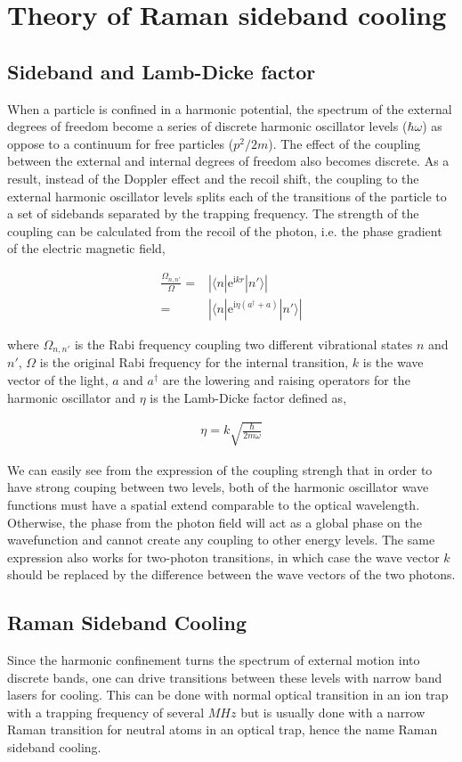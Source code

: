 \documentclass[aps,twocolumn,secnumarabic,balancelastpage,amsmath,amssymb,nofootinbib]{revtex4}
\newcommand{\ue}{\mathrm{e}}
\newcommand{\ui}{\mathrm{i}}
\newcommand{\eqar}[1]
{
  \begin{align*}
    #1
  \end{align*}
}
\newcommand{\paren}[1]{{\left({#1}\right)}}
\newcommand{\abs}[1]{{\left|{#1}\right|}}
\begin{document}
\section{Theory of Raman sideband cooling}
\subsection{Sideband and Lamb-Dicke factor}
When a particle is confined in a harmonic potential, the spectrum of the external degrees of freedom become a series of discrete harmonic oscillator levels ($\hbar\omega$) as oppose to a continuum for free particles ($p^2/2m$). The effect of the coupling between the external and internal degrees of freedom also becomes discrete. As a result, instead of the Doppler effect and the recoil shift, the coupling to the external harmonic oscillator levels splits each of the transitions of the particle to a set of sidebands separated by the trapping frequency. The strength of the coupling can be calculated from the recoil of the photon, i.e. the phase gradient of the electric magnetic field,
\eqar{
  \frac{\Omega_{n,n'}}{\Omega}=&\abs{\langle n|\ue^{\ui kr}|n'\rangle}\\
  =&\abs{\langle n|\ue^{\ui \eta\paren{a^\dagger+a}}|n'\rangle}
}
where $\Omega_{n,n'}$ is the Rabi frequency coupling two different vibrational states $n$ and $n'$, $\Omega$ is the original Rabi frequency for the internal transition, $k$ is the wave vector of the light, $a$ and $a^\dagger$ are the lowering and raising operators for the harmonic oscillator and $\eta$ is the Lamb-Dicke factor defined as,
\eqar{
  \eta=k\sqrt{\frac{\hbar}{2m\omega}}
}
We can easily see from the expression of the coupling strengh that in order to have strong couping between two levels, both of the harmonic oscillator wave functions must have a spatial extend comparable to the optical wavelength. Otherwise, the phase from the photon field will act as a global phase on the wavefunction and cannot create any coupling to other energy levels. The same expression also works for two-photon transitions, in which case the wave vector $k$ should be replaced by the difference between the wave vectors of the two photons.

\subsection{Raman Sideband Cooling}
Since the harmonic confinement turns the spectrum of external motion into discrete bands, one can drive transitions between these levels with narrow band lasers for cooling. This can be done with normal optical transition in an ion trap with a trapping frequency of several $MHz$ but is usually done with a narrow Raman transition for neutral atoms in an optical trap, hence the name Raman sideband cooling.\\
\end{document}

